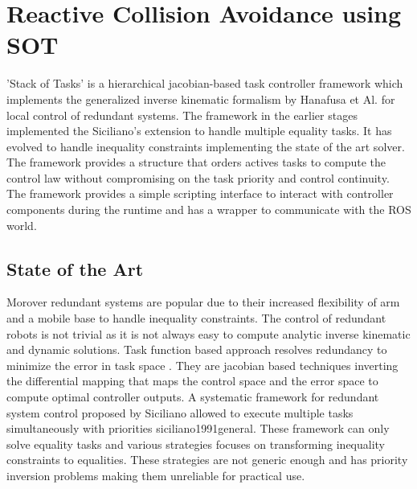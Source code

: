 \section{Reactive Collision Avoidance using SOT}
\label{sec:sot}
'Stack of Tasks' is a hierarchical jacobian-based task controller framework which implements the generalized inverse kinematic formalism by Hanafusa et Al. for local control of redundant systems\cite{hanafusa1981analysis}\cite{Mansard2009ik}. The framework in the earlier stages implemented the Siciliano's extension to handle multiple equality tasks\cite{siciliano1991general}. It has evolved to handle inequality constraints implementing the state of the art solver. The framework provides a structure that orders actives tasks to compute the control law without compromising on the task priority and control continuity. The framework provides a simple scripting interface to interact with controller components during the runtime and has a wrapper to communicate with the ROS world.
\subsection{State of the Art}






Morover  redundant systems are popular due to their increased flexibility of arm and a mobile base to handle inequality constraints. The control of redundant robots is not trivial as it is not always easy to compute  analytic inverse kinematic and dynamic solutions. Task function based approach  resolves redundancy to minimize the error in task space \cite{Samson1991}. They are jacobian based techniques inverting the differential mapping that maps the control space and the error space to compute optimal controller outputs. A systematic framework for redundant system control proposed by Siciliano allowed to execute multiple tasks simultaneously with priorities {siciliano1991general}. These framework can only solve equality tasks and various strategies focuses on transforming inequality constraints to equalities\cite{Nelson95strategiesfor,chan1995weighted,mansard2009directional,raunhardt2007progressive}. These strategies are not generic enough and has priority inversion problems making them unreliable for practical use. 

